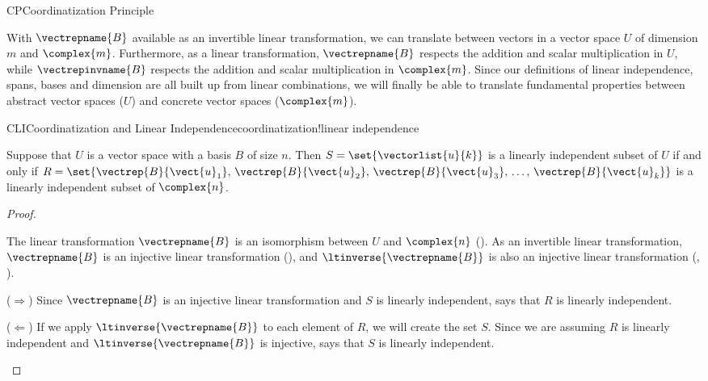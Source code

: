 %
\begin{subsect}{CP}{Coordinatization Principle}
%
\begin{para}With $\vectrepname{B}$ available as an invertible linear transformation, we can translate between vectors in a vector space $U$ of dimension $m$ and $\complex{m}$.  Furthermore, as a linear transformation, $\vectrepname{B}$ respects the addition and scalar multiplication in $U$, while $\vectrepinvname{B}$ respects the addition and scalar multiplication in $\complex{m}$.  Since our definitions of linear independence, spans, bases and dimension are all built up from linear combinations, we will finally be able to translate fundamental properties between abstract vector spaces ($U$) and concrete vector spaces ($\complex{m}$).\end{para}
%
\begin{theorem}{CLI}{Coordinatization and Linear Independence}{coordinatization!linear independence}
\begin{para}Suppose that $U$ is a vector space with a basis $B$ of size $n$.  Then $S=\set{\vectorlist{u}{k}}$ is a linearly independent subset of $U$ if and only if $R=\set{\vectrep{B}{\vect{u}_1},\,\vectrep{B}{\vect{u}_2},\,\vectrep{B}{\vect{u}_3},\,\ldots,\,\vectrep{B}{\vect{u}_k}}$ is a linearly independent subset of $\complex{n}$.\end{para}
\end{theorem}
%
\begin{proof}
\begin{para}The linear transformation $\vectrepname{B}$ is an isomorphism between $U$ and $\complex{n}$ ().   As an invertible linear transformation, $\vectrepname{B}$ is an injective linear transformation (),  and $\ltinverse{\vectrepname{B}}$ is also an injective linear transformation (, ).\end{para}
%
\begin{para}($\Rightarrow$)  Since $\vectrepname{B}$ is an injective linear transformation and $S$ is linearly independent,  says that $R$ is linearly independent.\end{para}
%
\begin{para}($\Leftarrow$)  If we apply $\ltinverse{\vectrepname{B}}$ to each element of $R$, we will create the set $S$.  Since we are assuming $R$ is linearly independent and $\ltinverse{\vectrepname{B}}$ is injective,  says that $S$ is linearly independent.\end{para}

\end{proof}
\end{subsect}
